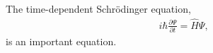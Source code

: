 \documentclass[10pt,a4paper]{article}
\begin{document}
The time-dependent Schr\"{o}dinger equation,
\begin{align*}
i\hbar\frac{\partial \Psi}{\partial t} = \hat{H} \Psi ,
\end{align*}
is an important equation.
\end{document}
